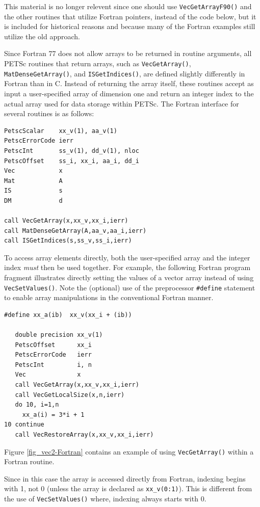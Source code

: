 This material is no longer relevent since one should use \lstinline{VecGetArrayF90()} and the other routines that utilize Fortran pointers, instead of the code below, but it is included for historical reasons and because many of the Fortran examples still utilize the old approach.

Since Fortran 77 does not allow arrays to be returned in routine
arguments, all PETSc routines that return arrays, such as
\lstinline{VecGetArray()}, \lstinline{MatDenseGetArray()},
and \lstinline{ISGetIndices()},
are defined slightly differently in Fortran than in C.
Instead of returning the array itself, these routines
accept as input a user-specified array of dimension one and return an
integer index to the actual array used for data storage within PETSc.
The Fortran interface for several routines is as follows:
\begin{lstlisting}
PetscScalar    xx_v(1), aa_v(1)
PetscErrorCode ierr
PetscInt       ss_v(1), dd_v(1), nloc
PetscOffset    ss_i, xx_i, aa_i, dd_i
Vec            x
Mat            A
IS             s
DM             d 

call VecGetArray(x,xx_v,xx_i,ierr)
call MatDenseGetArray(A,aa_v,aa_i,ierr)
call ISGetIndices(s,ss_v,ss_i,ierr)
\end{lstlisting}

To access array elements directly, both the user-specified array and
the integer index {\em must} then be used together.
For example, the following Fortran program fragment illustrates
directly setting the values of a vector array instead of using \lstinline{VecSetValues()}.  Note the (optional) use of the preprocessor
\lstinline{#define} statement to enable array manipulations in the conventional
Fortran manner.
\begin{lstlisting}
#define xx_a(ib)  xx_v(xx_i + (ib))

   double precision xx_v(1)
   PetscOffset      xx_i
   PetscErrorCode   ierr
   PetscInt         i, n
   Vec              x
   call VecGetArray(x,xx_v,xx_i,ierr)
   call VecGetLocalSize(x,n,ierr)
   do 10, i=1,n
     xx_a(i) = 3*i + 1
10 continue
   call VecRestoreArray(x,xx_v,xx_i,ierr)
\end{lstlisting}
Figure \ref{fig_vec2-Fortran} contains an example of using \lstinline{VecGetArray()}
within a Fortran routine.

Since in this case the array is accessed directly from Fortran,
indexing begins with 1, not 0 (unless the array is declared as \lstinline{xx_v(0:1)}).
This is different from the use of \lstinline{VecSetValues()}
where, indexing always starts with 0.

